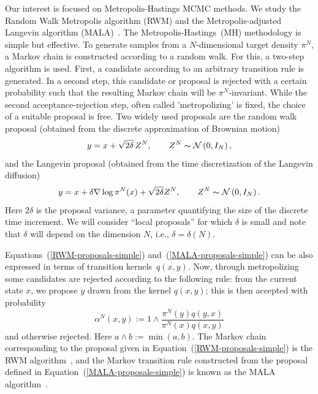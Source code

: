 Our interest is focused on Metropolis-Hastings MCMC methods. We study the Random Walk Metropolis algorithm (RWM) and the Metropolis-adjusted Langevin algorithm (MALA)~\autocite{Liu2004, Robert2005}. The Metropolis-Hastings~(MH) methodology is simple but effective. To generate samples from a $N$-dimensional target density $ \pi^{N} $, a Markov chain  is constructed according to a random walk. For this,  a two-step algorithm is used. First,  a candidate according to an arbitrary transition rule is generated. In a second step, this candidate or proposal is rejected with a certain probability such that the resulting Markov chain will be $\pi^N$-invariant. While the second acceptance-rejection step, often called 'metropolizing' is fixed, the choice of a suitable proposal is free. Two widely used proposals are the random walk proposal (obtained from
the discrete approximation of Brownian motion)
\begin{equation}
\label{RWM-proposals-simple} 
  y = x + \sqrt{2\delta}\,Z^{N}, \qquad Z^{N} \thicksim \mathcal{N}\left( 0,I_N \right),
\end{equation}
and the Langevin proposal (obtained from the time discretization of the
Langevin diffusion)
\begin{equation}
\label{MALA-proposals-simple}
  y = x +  \delta \nabla \log \pi^{N} (x) + \sqrt{2\delta} Z^N, \qquad Z^{N} \thicksim \mathcal{N}\left( 0,I_N \right).
\end{equation}
Here $ 2 \delta $ is the proposal variance, a parameter quantifying the size of the discrete time increment. We will consider “local proposals” for which $ \delta $ is
small and note that $ \delta $ will depend on the dimension $N$, i.e., $\delta  = \delta(N) $. 

Equations~(\ref{RWM-proposals-simple}) and~(\ref{MALA-proposals-simple}) can be also expressed in terms of transition kernels~$q(x,y)$. Now, through metropolizing some candidates are rejected according to the following rule: from the current state $ x $, we propose $ y $ drawn from the kernel $ q(x, y) $; this is then accepted with probability
\begin{equation}
\label{acceptance probability simple}
 \alpha^{N}(x,y)  := 1 \wedge \dfrac{\pi^{N}(y) q(y,x) }{\pi^{N}(x) q(x,y)}
\end{equation}
and otherwise rejected. Here $ a \wedge b := \min (a,b)$. The Markov chain corresponding to the proposal given in Equation~(\ref{RWM-proposals-simple}) is the RWM algorithm~\autocite{Metropolis1953}, and the Markov transition rule constructed from the proposal defined in Equation~(\ref{MALA-proposals-simple}) is known as the MALA algorithm~\autocite{Robert2005}.

